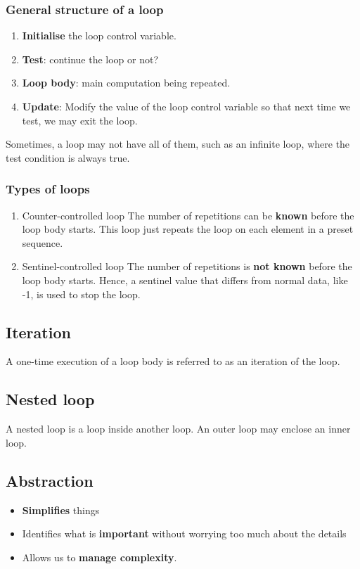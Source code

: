 \documentclass[11pt]{article}
\begin{document}
\subsubsection{General structure of a loop}
\label{sec:orge28667d}
\begin{enumerate}
\item \textbf{Initialise} the loop control variable.
\item \textbf{Test}: continue the loop or not?
\item \textbf{Loop body}: main computation being repeated.
\item \textbf{Update}: Modify the value of the loop control variable so that next time we test, we may exit the loop.
\end{enumerate}

Sometimes, a loop may not have all of them, such as an infinite loop, where the test condition is always true.

\subsubsection{Types of loops}
\label{sec:org73fee0a}
\begin{enumerate}
\item Counter-controlled loop
The number of repetitions can be \textbf{known} before the loop body starts. This loop just repeats the loop on each element in a preset sequence.

\item Sentinel-controlled loop
The number of repetitions is \textbf{not known} before the loop body starts. Hence, a sentinel value that differs from normal data, like -1, is used to stop the loop.
\end{enumerate}

\subsection{Iteration}
\label{sec:org71d0bc1}
A one-time execution of a loop body is referred to as an iteration of the loop.

\subsection{Nested loop}
\label{sec:orgbbbf19b}
A nested loop is a loop inside another loop. An outer loop may enclose an inner loop.

 \newpage

\subsection{Abstraction}
\label{sec:orgd456fce}
\begin{itemize}
\item \textbf{Simplifies} things
\item Identifies what is \textbf{important} without worrying too much about the details
\item Allows us to \textbf{manage complexity}.
\end{itemize}
\end{document}
